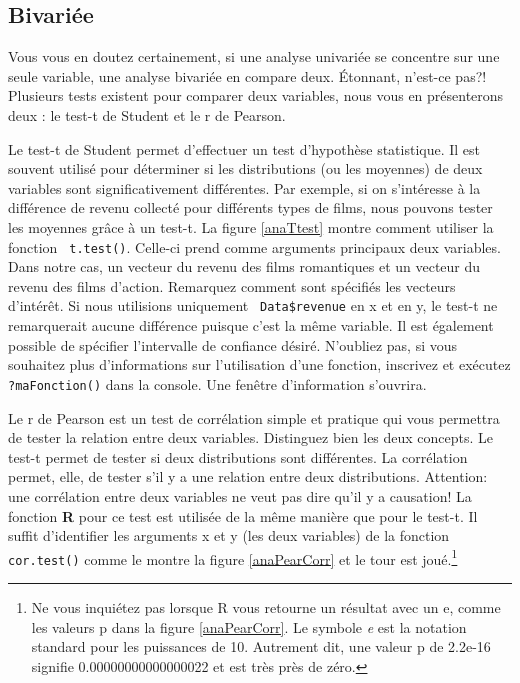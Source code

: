 \documentclass[10.5pt,a4paper]{article}
\newcommand{\rcode}[1]{\texttt{\color{rstudio} #1}}
\begin{document}
  \subsection{Bivariée}
  Vous vous en doutez certainement, si une analyse univariée se concentre sur une seule variable, une analyse bivariée en compare deux. Étonnant, n'est-ce pas?! Plusieurs tests existent pour comparer deux variables, nous vous en présenterons deux : le test-t de Student et le r de Pearson. 
  
  Le test-t de Student permet d'effectuer un test d'hypothèse statistique. Il est souvent utilisé pour déterminer si les distributions (ou les moyennes) de deux variables sont significativement différentes. Par exemple, si on s'intéresse à la différence de revenu collecté pour différents types de films, nous pouvons tester les moyennes grâce à un test-t. La figure \ref{anaTtest} montre comment utiliser la fonction \rcode{t.test()}. Celle-ci prend comme arguments principaux deux variables. Dans notre cas, un vecteur du revenu des films romantiques et un vecteur du revenu des films d'action. Remarquez comment sont spécifiés les vecteurs d'intérêt. Si nous utilisions uniquement \rcode{Data\$revenue} en x et en y, le test-t ne remarquerait aucune différence puisque c'est la même variable. Il est également possible de spécifier l'intervalle de confiance désiré. N'oubliez pas, si vous souhaitez plus d'informations sur l'utilisation d'une fonction, inscrivez et exécutez \rcode{?maFonction()} dans la console. Une fenêtre d'information s'ouvrira. 
  
  Le r de Pearson est un test de corrélation simple et pratique qui vous permettra de tester la relation entre deux variables. Distinguez bien les deux concepts. Le test-t permet de tester si deux distributions sont différentes. La corrélation permet, elle, de tester s'il y a une relation entre deux distributions. Attention: une corrélation entre deux variables ne veut pas dire qu'il y a causation! La fonction \textbf{R} pour ce test est utilisée de la même manière que pour le test-t. Il suffit d'identifier les arguments x et y (les deux variables) de la fonction \rcode{cor.test()} comme le montre la figure \ref{anaPearCorr} et le tour est joué.\footnote{Ne vous inquiétez pas lorsque R vous retourne un résultat avec un e, comme les  valeurs p dans la figure \ref{anaPearCorr}. Le symbole \textit{e} est la notation standard pour les puissances de 10. Autrement dit, une valeur p de 2.2e-16 signifie 0.00000000000000022 et est très près de zéro.}
  
\end{document}
